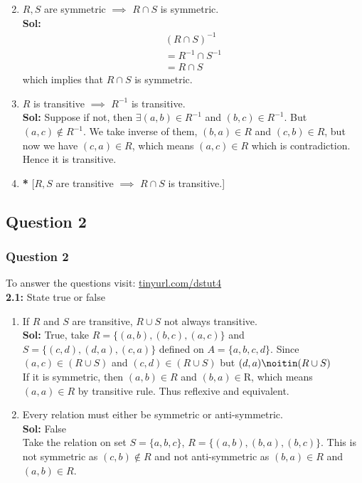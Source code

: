 \documentclass[xcolor=svgnames]{beamer}
\begin{document}
\begin{frame}{}
\begin{enumerate} \setcounter{enumi}{1}
    \item  $R,S$ are symmetric $\implies$ $R \cap S$ is symmetric.
    \\ \textbf{Sol:}
    \begin{align*}
        & (R \cap S)^{-1} &
        \\ &= R^{-1} \cap S^{-1}&
        \\ &= R \cap S
    \end{align*}
    which implies that $R \cap S$ is symmetric.
    \item  $R$ is transitive $\implies$ $R^{-1}$ is transitive.
    \\ \textbf{Sol:} Suppose if not, then $ \exists (a,b) \in R^{-1}$ and $(b,c) \in R^{-1}$. But $(a,c) \notin R^{-1}$. We take inverse of them, $(b,a) \in R$ and $(c,b) \in R$, but now we have $(c,a) \in R$, which means $(a,c) \in R$ which is contradiction. Hence it is transitive.
    \item  \textbf{*} [$R,S$ are transitive $\implies$ $R \cap S$ is transitive.]

\end{enumerate}

\end{frame}
\subsection{Question 2}
\begin{frame}
\frametitle{Question 2}
To answer the questions visit:  \href{https://tinyurl.com/dstut4}{\underline{tinyurl.com/dstut4}}\\
\textbf{2.1:} State true or false
\begin{enumerate}
    \item If $R$ and $S$ are transitive, $R \cup S$ not always transitive. 
    \\ \textbf{Sol:} True, take $R = \{(a,b), (b,c),(a,c)\}$ and $S = \{(c,d),(d,a),(c,a
    )\}$ defined on $A = \{a,b,c,d\}$. Since $(a,c) \in (R \cup S)$ and $(c,d) \in (R \cup S)$ but $(d,a) \noitin (R \cup S)$\\
    If it is symmetric, then $(a,b) \in R$ and $(b,a) \in $R, which means $(a,a) \in R$ by transitive rule. Thus reflexive and equivalent.
    \item Every relation must either be symmetric or anti-symmetric.
    \\ \textbf{Sol:} False \\
    Take the relation on set $S = \{a,b,c\}$, $R = \{(a,b),(b,a),(b,c)\}$. This is not symmetric as $(c,b) \notin R$ and not anti-symmetric as $(b,a) \in R$ and $(a,b) \in R$.
\end{enumerate}
\end{frame}
\end{document}
